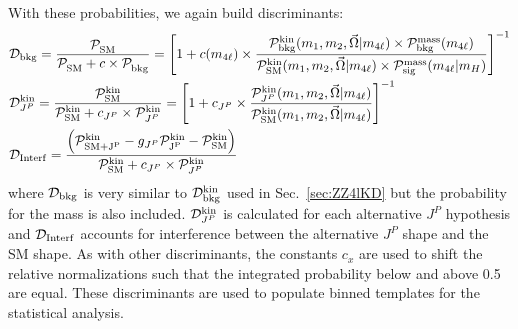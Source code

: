 With these probabilities, we again build discriminants:
\begin{align}
& {\mathcal{D}}_{\rm bkg} = \frac{{\mathcal{P}}^{\rm }_{\rm SM} }{{\mathcal{P}}^{\rm }_{\rm SM} +c\times{\mathcal{P}}^{\rm }_{\rm bkg} }=
\left[1+c(m_{4\ell})\times\frac{{\mathcal{P}}^{\rm kin}_{\rm bkg} (m_1, m_2, \vec\Omega | m_{4\ell})\times {\mathcal{P}}^{\rm mass}_{\rm bkg} (m_{4\ell})  }
{{\mathcal{P}}^{\rm kin}_{\rm SM} (m_1, m_2, \vec\Omega | m_{4\ell}) \times {\mathcal{P}}^{\rm mass}_{\rm sig} (m_{4\ell}|m_H) } \right]^{-1} \nonumber \\
& {\mathcal{D}}^{\rm kin}_{J^P} = \frac{{\mathcal{P}}^{\rm kin}_{\rm SM} }{{\mathcal{P}}^{\rm kin}_{\rm SM} +c_{J^P}\times{\mathcal{P}}^{\rm kin}_{J^P} }=
\left[1+c_{J^P}\times\frac{{\mathcal{P}}^{\rm kin}_{J^P} (m_1, m_2, \vec\Omega | m_{4\ell}) }
{{\mathcal{P}}^{\rm kin}_{\rm SM} (m_1, m_2, \vec\Omega | m_{4\ell}) } \right]^{-1} \nonumber \\
& {\mathcal{D}}_{\rm Interf} = \frac{ \left({\mathcal{P}}^{\rm kin}_{\rm SM + J^P} - g_{J^P}{\mathcal{P}}^{\rm kin}_{\rm J^P} - {\mathcal{P}}^{\rm kin}_{\rm SM}\right)}{{\mathcal{P}}^{\rm kin}_{\rm SM} +c_{J^P}\times{\mathcal{P}}^{\rm kin}_{J^P} } \nonumber
\end{align}
where ${\mathcal{D}}_{\rm bkg}$ is very similar to ${\mathcal{D}}_{\rm bkg}^{\rm kin}$ used in Sec.~\ref{sec:ZZ4lKD} but the probability for the mass is also included. ${\mathcal{D}}^{\rm kin}_{J^P}$ is calculated for each alternative $J^P$ hypothesis and ${\mathcal{D}}_{\rm Interf}$ accounts for interference between the alternative $J^P$ shape and the SM shape. As with other discriminants, the constants $c_x$ are used to shift the relative normalizations such that the integrated probability below and above 0.5 are equal. These discriminants are used to populate binned templates for the statistical analysis.

